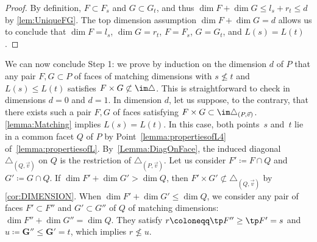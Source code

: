 \begin{proof}
By definition, $F\subset F_s$ and $G\subset G_t$, and thus $\dim F + \dim G\leq l_s + r_t\leq d$ by \cref{lem:UniqueFG}.
The top dimension assumption $\dim F+\dim G=d$ allows us to conclude that
$\dim F=l_s$, $\dim G=r_t$, $F=F_s$, $G=G_t$, and $L(s)=L(t)$.
\end{proof}

We can now conclude Step 1: we prove by induction on the dimension $d$ of $P$ that any pair $F, G\subset P$ of faces of matching dimensions with $s\not\leq t$ and $L(s)\leq L(t)$ satisfies
${F}\times {G}\not\subset \im\triangle$.
This is straightforward to check in dimensions $d=0$ and $d=1$.
In dimension $d$, let us suppose, to the contrary, that there exists such a pair $F,G$ of faces satisfying ${F}\times {G}\subset \im\triangle_{(P, \vec v)}$.
\cref{lemma:Matching} implies $L(s)=L(t)$.
In this case, both points~$s$ and~$t$ lie in a common facet $Q$ of $P$ by Point~\eqref{lemma:propertiesofL4} of~\cref{lemma:propertiesofL}.
By~\cref{Lemma:DiagOnFace}, the induced diagonal $\triangle_{(Q,\vec v)}$ on $Q$ is the restriction of ${\triangle_{(P, \vec v)}}$.
Let us consider $F'\coloneqq F\cap Q$ and $G'\coloneqq G\cap Q$. If $\dim F'+\dim G'> \dim Q$, then
$F'\times G'\not \subset \triangle_{(Q,\vec v)}$ by \cref{cor:DIMENSION}. When $\dim F'+\dim G'\leq \dim Q$, we consider any pair of faces $F'\subset F''$ and $G'\subset G''$ of $Q$ of matching dimensions: $\dim F''+\dim G''=\dim Q$.
They satisfy $r\coloneqq\tp F''\geq \tp F'=s$ and $u \coloneqq\bm G''\leq \bm G'=t$, which implies $r \not \leq u$.

